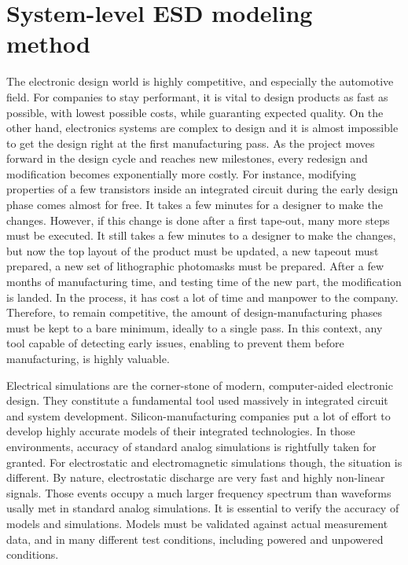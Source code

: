 \section{System-level ESD modeling method}
\label{sec:esd-modeling}

The electronic design world is highly competitive, and especially the automotive field.
For companies to stay performant, it is vital to design products as fast as possible, with lowest possible costs, while guaranting expected quality.
On the other hand, electronics systems are complex to design and it is almost impossible to get the design right at the first manufacturing pass.
As the project moves forward in the design cycle and reaches new milestones, every redesign and modification becomes exponentially more costly.
For instance, modifying properties of a few transistors inside an integrated circuit during the early design phase comes almost for free.
It takes a few minutes for a designer to make the changes.
However, if this change is done after a first tape-out, many more steps must be executed.
It still takes a few minutes to a designer to make the changes, but now the top layout of the product must be updated, a new tapeout must prepared, a new set of lithographic photomasks must be prepared.
After a few months of manufacturing time, and testing time of the new part, the modification is landed.
In the process, it has cost a lot of time and manpower to the company.
Therefore, to remain competitive, the amount of design-manufacturing phases must be kept to a bare minimum, ideally to a single pass.
In this context, any tool capable of detecting early issues, enabling to prevent them before manufacturing, is highly valuable.


Electrical simulations are the corner-stone of modern, computer-aided electronic design.
They constitute a fundamental tool used massively in integrated circuit and system development.
Silicon-manufacturing companies put a lot of effort to develop highly accurate models of their integrated technologies.
In those environments, accuracy of standard analog simulations is rightfully taken for granted.
For electrostatic and electromagnetic simulations though, the situation is different.
By nature, electrostatic discharge are very fast and highly non-linear signals.
Those events occupy a much larger frequency spectrum than waveforms usally met in standard analog simulations.
It is essential to verify the accuracy of models and simulations.
Models must be validated against actual measurement data, and in many different test conditions, including powered and unpowered conditions.

